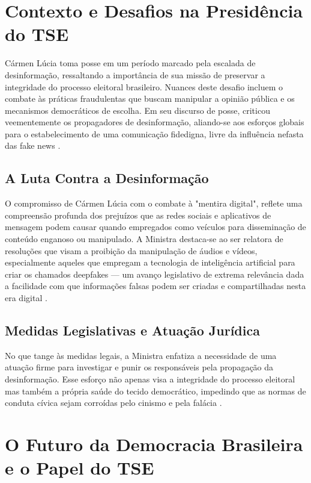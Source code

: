 \documentclass[
   article,       
   12pt,          
   oneside,       
   a4paper,       
   english,       
   brazil,        
   sumario=tradicional
   ]{abntex2}
\begin{document}
\section{Contexto e Desafios na Presidência do TSE}

Cármen Lúcia toma posse em um período marcado pela escalada de desinformação, ressaltando a importância de sua missão de preservar a integridade do processo eleitoral brasileiro. Nuances deste desafio incluem o combate às práticas fraudulentas que buscam manipular a opinião pública e os mecanismos democráticos de escolha. Em seu discurso de posse, criticou veementemente os propagadores de desinformação, aliando-se aos esforços globais para o estabelecimento de uma comunicação fidedigna, livre da influência nefasta das fake news \cite{Carmen_Lucia_toma_posse_na_presidencia_do_TSE}.

\subsection{A Luta Contra a Desinformação}

O compromisso de Cármen Lúcia com o combate à "mentira digital", reflete uma compreensão profunda dos prejuízos que as redes sociais e aplicativos de mensagem podem causar quando empregados como veículos para disseminação de conteúdo enganoso ou manipulado. A Ministra destaca-se ao ser relatora de resoluções que visam a proibição da manipulação de áudios e vídeos, especialmente aqueles que empregam a tecnologia de inteligência artificial para criar os chamados deepfakes — um avanço legislativo de extrema relevância dada a facilidade com que informações falsas podem ser criadas e compartilhadas nesta era digital \cite{Contra_o_virus_da_mentira_ha_o_remedio_da_inf}.

\subsection{Medidas Legislativas e Atuação Jurídica}

No que tange às medidas legais, a Ministra enfatiza a necessidade de uma atuação firme para investigar e punir os responsáveis pela propagação da desinformação. Esse esforço não apenas visa a integridade do processo eleitoral mas também a própria saúde do tecido democrático, impedindo que as normas de conduta cívica sejam corroídas pelo cinismo e pela falácia \cite{Mendonca_e_o_unico_ministro_do_STF_a_faltar_a}.

\section{O Futuro da Democracia Brasileira e o Papel do TSE}
\end{document}
